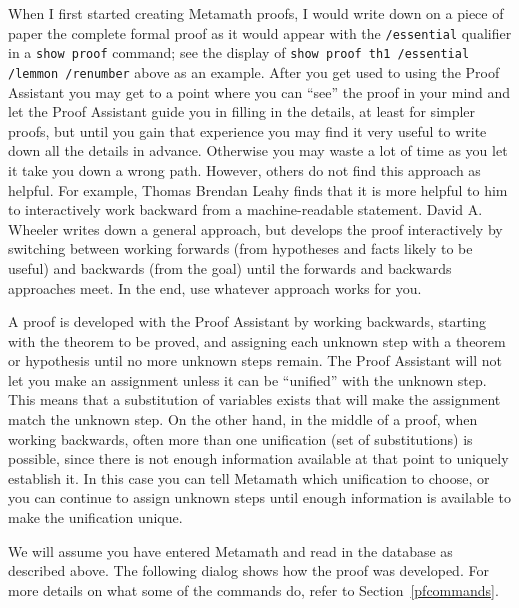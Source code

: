 When I first started creating Metamath proofs, I would write down
on a piece of paper the complete
formal proof as it would appear with the \texttt{/essential}
qualifier in a \texttt{show proof} command; see
the display of \texttt{show proof th1 /essential /lemmon /re\-num\-ber} above as an
example.  After you get used to using the Proof Assistant you may get to a point where you can ``see'' the proof in your mind
and let the Proof Assistant guide you in filling in the details, at least for
simpler proofs, but until you gain that experience you may find it very useful
to write down all the details in advance.
Otherwise you may waste a lot of time as you let it take you down a wrong path.
However, others do not find this approach as helpful.
For example, Thomas Brendan Leahy
finds that it is more helpful to him to interactively
work backward from a machine-readable statement.
David A. Wheeler
writes down a general approach, but develops the proof
interactively by switching between
working forwards (from hypotheses and facts likely to be useful) and
backwards (from the goal) until the forwards and backwards approaches meet.
In the end, use whatever approach works for you.

A proof is developed with the Proof Assistant by working backwards, starting
with the theorem to be proved, and assigning each unknown step
with a theorem or hypothesis until no more unknown steps remain.  The Proof
Assistant will not let you make an assignment unless it can be ``unified''
with the unknown step.  This means that a
substitution of
variables exists that will make the assignment match the unknown step.  On the
other hand, in the middle of a proof, when working backwards, often more than
one unification (set of substitutions) is possible, since
there is not enough information available at that point to uniquely establish
it.  In this case you can tell Metamath which unification to choose, or you
can continue to assign unknown steps until enough information is available to
make the unification unique.

We will assume you have entered Metamath and read in the database as described
above.  The following dialog shows how the proof was developed.  For more
details on what some of the commands do, refer to Section~\ref{pfcommands}.

